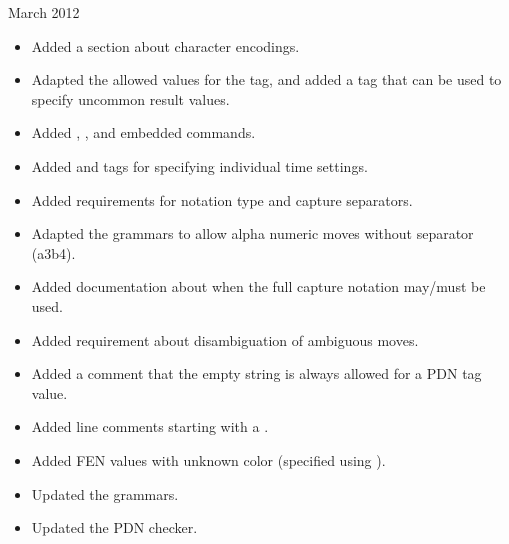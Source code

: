 \documentclass[letterpaper,10pt,english]{sphinxmanual}
\begin{document}
 March 2012
\begin{itemize}
\item {} 
\sphinxAtStartPar
Added a section about character encodings.

\item {} 
\sphinxAtStartPar
Adapted the allowed values for the  tag, and added a  tag that can be used to specify uncommon result values.

\item {} 
\sphinxAtStartPar
Added , ,  and  embedded commands.

\item {} 
\sphinxAtStartPar
Added  and  tags for specifying individual time settings.

\item {} 
\sphinxAtStartPar
Added requirements for notation type and capture separators.

\item {} 
\sphinxAtStartPar
Adapted the grammars to allow alpha numeric moves without separator (a3b4).

\item {} 
\sphinxAtStartPar
Added documentation about when the full capture notation may/must be used.

\item {} 
\sphinxAtStartPar
Added requirement about disambiguation of ambiguous moves.

\item {} 
\sphinxAtStartPar
Added a comment that the empty string is always allowed for a PDN tag value.

\item {} 
\sphinxAtStartPar
Added line comments starting with a \sphinxcode{\sphinxupquote{\%}}.

\item {} 
\sphinxAtStartPar
Added FEN values with unknown color (specified using ).

\item {} 
\sphinxAtStartPar
Updated the grammars.

\item {} 
\sphinxAtStartPar
Updated the PDN checker.

\end{itemize}
\end{document}
